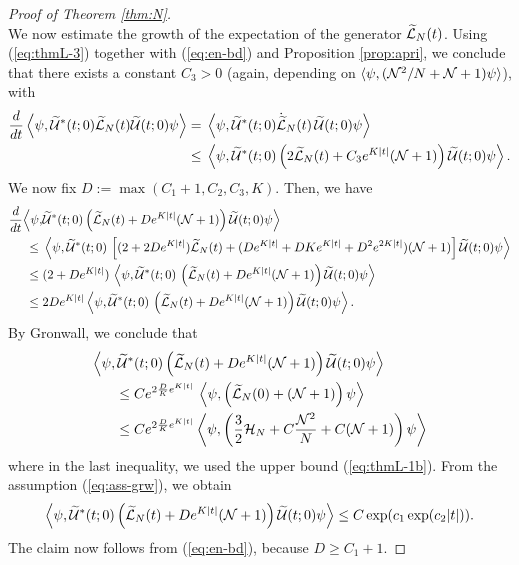 \documentclass[11pt,a4paper]{article}
\newcommand{\done}{}
\newcommand{\ech}[2]{#2}	%
\newcommand{\cU}{{\cal U}}
\newcommand{\wt}{\widetilde}
\newcommand{\cH}{{\cal H}}
\newcommand{\cL}{{\cal L}}
\newcommand{\cN}{{\cal N}}
\begin{document}
\begin{proof}[Proof of Theorem \ref{thm:N}]
\[ \]
We now estimate the growth of the expectation\done{} of the generator $\wt{\cL}_N (t)$. Using (\ref{eq:thmL-3}) together with (\ref{eq:en-bd}) and Proposition \ref{prop:apri}, we conclude that there exists a constant $C_3 >0$ (again, depending on $\langle \psi , (\cN^2/ N + \cN + 1) \psi \rangle$\ech{ and on the constant $C$ in (\ref{eq:varphi-bds})}{}), with 
\[ \begin{split}
\frac{d}{dt} \left\langle \psi, \wt{\cU}^* (t;0) \wt{\cL}_N (t) \wt{\cU} (t;0) \psi \right\rangle = \; & \left\langle \psi, \wt{\cU}^* (t;0) \dot{\wt{\cL}}_N (t) \, \wt{\cU} (t;0) \psi \right\rangle \\ \leq \; & \left\langle \psi , \wt{\cU}^* (t;0) \left( 2 \wt{\cL}_N (t) + C_3 e^{K|t|} (\cN + 1) \right) \wt{\cU} (t;0) \psi \right\rangle. 
\end{split} \]
We now fix $D := \max (C_1 + 1, C_2 , C_3 , K)$. Then, we have
\[ \begin{split} 
\frac{d}{dt} \Big\langle \psi , &\wt{\cU}^* (t;0) \left( \wt{\cL}_N (t) + D e^{K \lvert t\rvert} (\cN + 1) \right) \wt{\cU} (t;0) \psi \Big\rangle \\  \leq \; & \left\langle \psi, \wt{\cU}^* (t;0) \, \left[ (2 + 2D e^{K|t|}) \wt{\cL}_N (t) + (D e^{K |t|} +D K e^{K |t|} + D^2 e^{2K |t|}) (\cN + 1) \right] \wt{\cU} (t;0) \psi \right\rangle\\  \leq \; &(2 + D e^{K|t|}) \, \left\langle \psi, \wt{\cU}^* (t;0) \, \left( \wt{\cL}_N (t) + D e^{K|t|} (\cN + 1) \right) \wt{\cU} (t;0) \psi \right \rangle \\ \leq \; & 2D e^{K |t|} \left\langle \psi, \wt{\cU}^* (t;0) \, \left( \wt{\cL}_N (t) + D e^{K|t|} (\cN + 1) \right) \wt{\cU} (t;0) \psi \right\rangle. \end{split} \]
By Gronwall, we conclude that
\[ \begin{split}  \Big\langle \psi , \wt{\cU}^* &(t;0) \left( \wt{\cL}_N (t) + 
D e^{K \lvert t\rvert} (\cN + 1) \right) \wt{\cU} (t;0) \psi \Big\rangle \\ \leq \; & C e^{2 \frac{D}{K} e^{K |t|}} \, \left\langle \psi , \left( \wt{\cL}_N (0) + (\cN + 1)\right) \psi \right\rangle \\ \leq \; &  C e^{2 \frac{D}{K} e^{K |t|}} \left\langle \psi , \left( \frac{3}{2} \cH_N+ C \frac{\cN^2}{N} + C (\cN+ 1) \right) \psi \right\rangle \end{split} \]
where in the last inequality, we used the upper bound (\ref{eq:thmL-1b}). {F}rom the assumption (\ref{eq:ass-grw}), we obtain 
\[  \Big\langle \psi , \wt{\cU}^* (t;0) \left( \wt{\cL}_N (t) + 
D e^{K \lvert t\rvert} (\cN + 1) \right) \wt{\cU} (t;0) \psi \Big\rangle
\leq C \exp (c_1 \exp (c_2 |t|)). \]
The claim now follows from (\ref{eq:en-bd}), because $D \geq C_1 +1$.
\end{proof}
\end{document}
